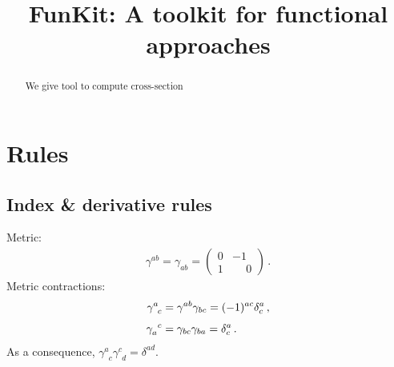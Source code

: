 \documentclass[aps,10pt,prd,nofootinbib,superscriptaddress,twocolumn]{revtex4-2}
\newcommand{\gettitle}{FunKit: A toolkit for functional approaches}
\begin{document}
\title{\gettitle}

\begin{abstract}

We give tool to compute cross-section
\end{abstract}

\maketitle


\section{Rules}
\label{sec:rules}

\subsection{Index \& derivative rules}
\label{sec:rules_indicesDerivatives}

Metric:
%
\begin{align}
	\gamma^{ab}=\gamma_{ab} = \begin{pmatrix}
		0&-1\\
		1&\phantom{-}0
	\end{pmatrix}
	\,.
\end{align}
%
Metric contractions:
%
\begin{align}
	\gamma^{a}_{\phantom{a}c} &= \gamma^{ab}\gamma_{bc} = (-1)^{ac}\delta^a_c
	\,,\notag\\[1ex]
	\gamma_{a}^{\phantom{a}c} &= \gamma_{bc}\gamma_{ba} = \delta^a_c
	\,.
\end{align}
%
As a consequence, $\gamma^{a}_{\phantom{a}c}\gamma^{c}_{\phantom{c}d} = \delta^{ad}$.
\end{document}
